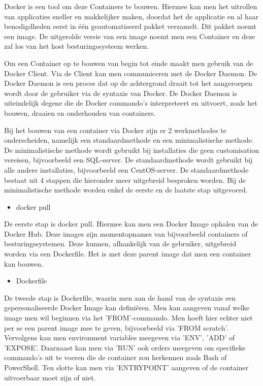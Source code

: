 Docker is een tool om deze Containers te bouwen. Hiermee kan men het uitrollen van applicaties sneller en makkelijker maken, doordat het de applicatie en al haar benodigdheden eerst in één geautomatiseerd pakket verzamelt. Dit pakket noemt een image. De uitgerolde versie van een image noemt men een Container en deze zal los van het host besturingssysteem werken.

Om een Container op te bouwen van begin tot einde maakt men gebruik van de Docker Client. Via de Client kan men communiceren met de Docker Daemon. De Docker Daemon is een proces dat op de achtergrond draait tot het aangeroepen wordt door de gebruiker via de syntaxis van Docker. De Docker Daemon is uiteindelijk degene die de Docker commando's interpreteert en uitvoert, zoals het bouwen, draaien en onderhouden van containers.

Bij het bouwen van een container via Docker zijn er 2 werkmethodes te onderscheiden, namelijk een standaardmethode en een minimalistische methode. De minimalistische methode wordt gebruikt bij installaties die geen customisation vereisen, bijvoorbeeld een SQL-server. De standaardmethode wordt gebruikt bij alle andere installaties, bijvoorbeeld een CentOS-server. De standaardmethode bestaat uit 4 stappen die hieronder meer uitgebreid besproken worden. Bij de minimalistische methode worden enkel de eerste en de laatste stap uitgevoerd. 

\begin{itemize}[noitemsep]
	\item docker pull
\end{itemize}
De eerste stap is docker pull. Hiermee kan men een Docker Image ophalen van de Docker Hub. Deze images zijn momentopnames van bijvoorbeeld containers of besturingssystemen. Deze kunnen, afhankelijk van de gebruiker, uitgebreid worden via een Dockerfile. Het is met deze parent image dat men een container kan bouwen.

\begin{itemize}[noitemsep]
	\item Dockerfile
\end{itemize}
De tweede stap is Dockerfile, waarin men aan de hand van de syntaxis een gepersonaliseerde Docker Image kan definiëren. Men kan aangeven vanaf welke image men wil beginnen via het 'FROM'-commando. Men hoeft hier echter niet per se een parent image mee te geven, bijvoorbeeld via 'FROM scratch'. Vervolgens kan men environment variables meegeven via 'ENV', 'ADD' of 'EXPOSE'. Daarnaast kan men via 'RUN' ook orders meegeven om specifieke commando's uit te voeren die de container zou herkennen zoals Bash of PowerShell. Ten slotte kan men via 'ENTRYPOINT' aangeven of de container uitvoerbaar moet zijn of niet.

